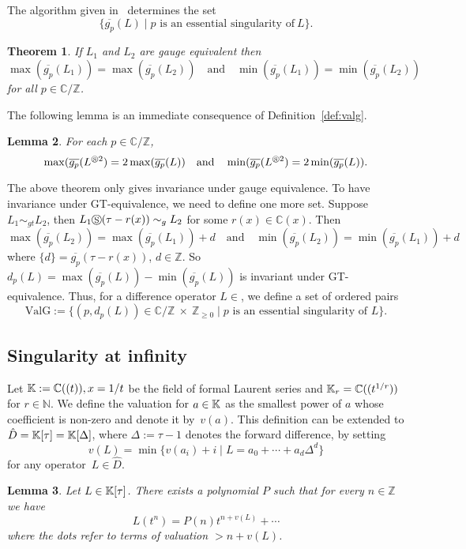 \documentclass{article}
\newtheorem{theorem}{Theorem}[section]
\newtheorem{lemma}[theorem]{Lemma}
\newcommand{\Z}{{\mathbb{Z}}} \newcommand{\Q}{{\mathbb{Q}}}
\newcommand{\C}{{\mathbb{C}}} \newcommand{\N}{{\mathbb{N}}}
\newcommand{\cS}{\circledS}
\newcommand{\valg}{\mathrm{ValG}}
\begin{document}
The algorithm given in~\cite{HO99} determines the set 
\[
\{ \overline{g_p}(L) \mid p \text{ \  is an essential singularity of}\  L \}.
\] 



\begin{theorem}
    \label{gp}\cite[Theorem 1]{CH09}
If $L_1$ and $L_2$ are gauge equivalent then 
$$\max(\overline{g_p}(L_1))=\max( \overline{g_p}(L_2) ) \quad \text{and} \quad \min(\overline{g_p}(L_1))=\min(\overline{g_p}(L_2))$$
for all $p \in \C/\Z$.  
\end{theorem}



The following lemma is an immediate consequence of Definition~\ref{def:valg}.
\begin{lemma}
For each $p \in \C/\Z$, 
$$\max(\overline{g_p}(L^{\cS 2})=2\max(\overline{g_p}(L)) \quad \text{and} \quad
\min(\overline{g_p}(L^{\cS 2})=2\min(\overline{g_p}(L)).$$
\end{lemma}

The above theorem only gives invariance under gauge equivalence. 
To have invariance under GT-equivalence, we need to define one more set. 
Suppose $L_1 \sim_{gt} L_2$, then $L_1 \cS (\tau-r(x)) \sim_g L_2$ for some $r(x) \in \C(x)$. 
Then $$\max(\overline{g_p}(L_2))=\max( \overline{g_p}(L_1) )+d \quad \text{and} \quad \min(\overline{g_p}(L_2))=\min( \overline{g_p}(L_1) )+d$$
where $\{ d\}=\overline{g_p}(\tau-r(x))$, $d \in \Z$. So $d_p(L)=\max(\overline{g_p}(L))-\min(\overline{g_p}(L))$ is invariant under GT-equivalence.
Thus, for a difference operator $L \in $, we define a set of ordered pairs
$$\valg:=\{ (p, d_p(L)) \in \C/\Z \ \times \  \Z_{\geq 0} \mid p \text{ \ is an essential singularity of \ } L \}.$$


\subsection{Singularity at infinity}

Let $\K:=\C((t)), x=1/t$ be the field of formal Laurent series and $\K_r=\C((t^{1/r}))$ for $r \in \N$. We define the valuation
for $a \in {\mathbb{K}}$ as the smallest power of $a$ whose coefficient is non-zero and denote it
by~$v(a)$.  This definition can be extended to $\hat{D}={\mathbb{K}}[\tau]={\mathbb{K}}[\Delta]$, where
$\Delta:=\tau-1$ denotes the forward difference, by setting
\[
v(L)=\min \{ v(a_i)+i\mid L=a_0+\cdots+a_d \Delta^d\}
\]
for any operator~$L\in\hat{D}$.

\begin{lemma}
\label{ind}
Let $L \in {\mathbb{K}}[\tau]$.  There exists a polynomial $P$ such that
for every $n \in \Z$ we have
\begin{equation}\label{tn}
	L(t^n) = P(n) t^{n + v(L)} + \cdots
\end{equation}
where the dots refer to terms of valuation $> n + v(L)$.
\end{lemma}
\end{document}
